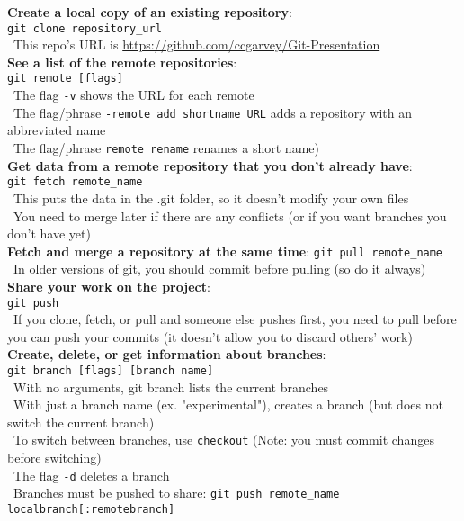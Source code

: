 \documentclass[12pt]{article}
\begin{document}
{{\bf Create a local copy of an existing repository}:\\
\texttt{git clone repository{\_}url}\\
\textbullet\, This repo's URL is \url{https://github.com/ccgarvey/Git-Presentation}\\

{\bf See a list of the remote repositories}:\\
\texttt{git remote [flags]}\\
\textbullet\, The flag \texttt{-v} shows the URL for each remote\\
\textbullet\, The flag/phrase \texttt{-remote add shortname URL} adds a repository with an abbreviated name\\
\textbullet\, The flag/phrase \texttt{remote rename} renames a short name)\\

{\bf Get data from a remote repository that you don't already have}:\\
\texttt{git fetch remote{\_}name}\\
\textbullet\, This puts the data in the .git folder, so it doesn't modify your own files\\
\textbullet\, You need to merge later if there are any conflicts (or if you want branches you don't have yet)\\
    
{\bf Fetch and merge a repository at the same time}:
\texttt{git pull remote{\_}name}\\
\textbullet\, In older versions of git, you should commit before pulling (so do it always)\\

{\bf Share your work on the project}:\\
\texttt{git push}\\
\textbullet\, If you clone, fetch, or pull and someone else pushes first, you need to pull before you can push your commits (it doesn't allow you to discard others' work)\\

{\bf Create, delete, or get information about branches}:\\
\texttt{git branch [flags] [branch name]}\\
\textbullet\, With no arguments, git branch lists the current branches\\
\textbullet\, With just a branch name (ex. "experimental"), creates a branch (but does not switch the current branch)\\
\textbullet\, To switch between branches, use \texttt{checkout} (Note: you must commit changes before switching)\\
\textbullet\, The flag \texttt{-d} deletes a branch\\
\textbullet\, Branches must be pushed to share: 
\texttt{git push remote{\_}name localbranch[:remotebranch]}\\ %

}
\end{document}
